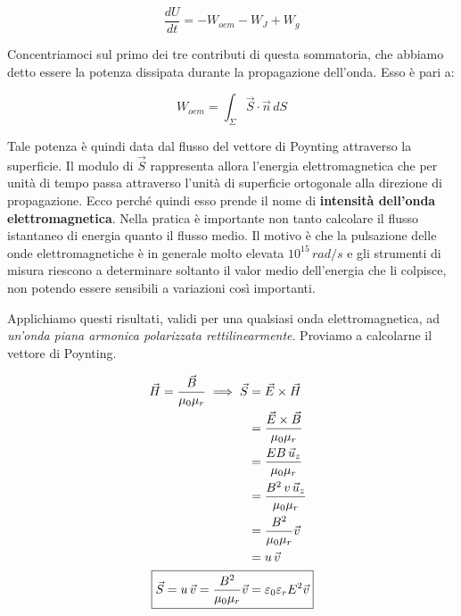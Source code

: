 \[
	\frac{dU}{dt} = - W_{oem} - W_J + W_g
\]

Concentriamoci sul primo dei tre contributi di questa sommatoria, che abbiamo detto essere la potenza dissipata durante la propagazione dell'onda. Esso è pari a:

\[
	W_{oem} = \int_{\Sigma} \vec{S} \cdot \vec{n} \,dS
\]

Tale potenza è quindi data dal flusso del vettore di Poynting attraverso la superficie. Il modulo di $\vec{S}$ rappresenta allora l'energia elettromagnetica che per unità di tempo passa attraverso l'unità di superficie ortogonale alla direzione di propagazione. Ecco perché quindi esso prende il nome di \textbf{intensità dell'onda elettromagnetica}.
Nella pratica è importante non tanto calcolare il flusso istantaneo di energia quanto il flusso medio. Il motivo è che la pulsazione delle onde elettromagnetiche è in generale molto elevata $ 10^{15}\,rad/s $ e gli strumenti di misura riescono a determinare soltanto il valor medio dell'energia che li colpisce, non potendo essere sensibili a variazioni così importanti.

Applichiamo questi risultati, validi per una qualsiasi onda elettromagnetica, ad \emph{un'onda piana armonica polarizzata rettilinearmente}. Proviamo a calcolarne il vettore di Poynting.

\begin{align*}
		\vec{H} = \frac{\vec{B}}{\mu_0 \mu_r} \implies \vec{S} &= \vec{E} \times \vec{H} \\
		&=\frac{\vec{E} \times \vec{B}}{\mu_0 \mu_r} \\
		&=\frac{EB\,\vec{u}_z}{\mu_0 \mu_r} \\
		&=\frac{B^2 \,v\,\vec{u}_z}{\mu_0 \mu_r} \\
		&=\frac{B^2}{\mu_0 \mu_r}\vec{v} \\
		&=u\,\vec{v} \\
	\Aboxed{\vec{S} = u\,\vec{v} = \frac{B^2}{\mu_0 \mu_r}\vec{v} &= \varepsilon_0 \varepsilon_r E^2 \vec{v}}
\end{align*}

